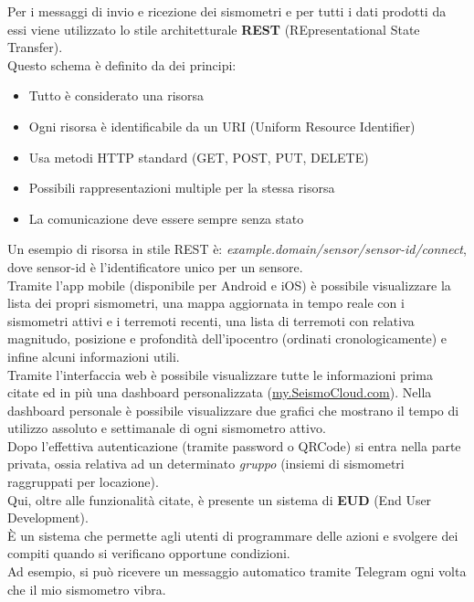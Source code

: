 \documentclass[a4paper,10pt]{memoir}
\begin{document}
\clearpage


Per i messaggi di invio e ricezione dei sismometri e per tutti i dati prodotti da essi viene utilizzato lo stile architetturale \textbf{REST} (REpresentational State Transfer).
\\
Questo schema è definito da dei principi: 
\begin{itemize}
  \item Tutto è considerato una risorsa
  \item Ogni risorsa è identificabile da un URI (Uniform Resource Identifier)
  \item Usa metodi HTTP standard (GET, POST, PUT, DELETE)
  \item Possibili rappresentazioni multiple per la stessa risorsa
  \item La comunicazione deve essere sempre senza stato
\end{itemize}
Un esempio di risorsa in stile REST è: \textit{example.domain/sensor/sensor-id/connect}, dove sensor-id è l'identificatore unico per un sensore.
\\
Tramite l'app mobile (disponibile per Android e iOS) è possibile visualizzare la lista dei propri sismometri, una mappa aggiornata in tempo reale con i sismometri attivi e i terremoti recenti, una lista di terremoti con relativa magnitudo, posizione e profondità dell'ipocentro (ordinati cronologicamente) e infine alcuni informazioni utili.
\\
Tramite l'interfaccia web è possibile visualizzare tutte le informazioni prima citate ed in più una dashboard personalizzata (\href{https://my.seismocloud.com}{my.SeismoCloud.com}).
Nella dashboard personale è possibile visualizzare due grafici che mostrano il tempo di utilizzo assoluto e settimanale di ogni sismometro attivo.
\\
Dopo l'effettiva autenticazione (tramite password o QRCode) si entra nella parte privata, ossia relativa ad un determinato \textit{gruppo} (insiemi di sismometri raggruppati per locazione).
\\
Qui, oltre alle funzionalità citate, è presente un sistema di \textbf{EUD} (End User Development).
\\
È un sistema che permette agli utenti di programmare delle azioni e svolgere dei compiti quando si verificano opportune condizioni.
\\
Ad esempio, si può ricevere un messaggio automatico tramite Telegram ogni volta che il mio sismometro vibra.
\end{document}
